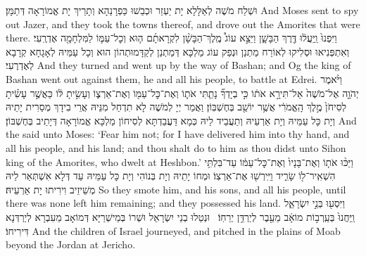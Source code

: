 {וּשְׁלַח מֹשֶׁה לְאַלָּלָא יָת יַעְזֵר וּכְבַשׁוּ כַּפְרָנַהָא וְתָרֵיךְ יָת אֱמוֹרָאָה דְּתַמָּן׃}
{And Moses sent to spy out Jazer, and they took the towns thereof, and drove out the Amorites that were there.}{}
{וַיִּפְנוּ֙ וַֽיַּעֲל֔וּ דֶּ֖רֶךְ הַבָּשָׁ֑ן וַיֵּצֵ֣א עוֹג֩ מֶֽלֶךְ־הַבָּשָׁ֨ן לִקְרָאתָ֜ם ה֧וּא וְכׇל־עַמּ֛וֹ לַמִּלְחָמָ֖ה אֶדְרֶֽעִי׃}
{וְאִתְפְּנִיאוּ וּסְלִיקוּ לְאוֹרַח מַתְנַן וּנְפַק עוֹג מַלְכָּא דְּמַתְנַן לְקַדָּמוּתְהוֹן הוּא וְכָל עַמֵּיהּ לְאָגָחָא קְרָבָא לְאֶדְרֶעִי׃}
{And they turned and went up by the way of Bashan; and Og the king of Bashan went out against them, he and all his people, to battle at Edrei.}{}
{וַיֹּ֨אמֶר יְהֹוָ֤ה אֶל־מֹשֶׁה֙ אַל־תִּירָ֣א אֹת֔וֹ כִּ֣י בְיָדְךָ֞ נָתַ֧תִּי אֹת֛וֹ וְאֶת־כׇּל־עַמּ֖וֹ וְאֶת־אַרְצ֑וֹ וְעָשִׂ֣יתָ לּ֔וֹ כַּאֲשֶׁ֣ר עָשִׂ֗יתָ לְסִיחֹן֙ מֶ֣לֶךְ הָֽאֱמֹרִ֔י אֲשֶׁ֥ר יוֹשֵׁ֖ב בְּחֶשְׁבּֽוֹן׃
}
{וַאֲמַר יְיָ לְמֹשֶׁה לָא תִדְחַל מִנֵּיהּ אֲרֵי בִידָךְ מְסַרִית יָתֵיהּ וְיָת כָּל עַמֵּיהּ וְיָת אַרְעֵיהּ וְתַעֲבֵיד לֵיהּ כְּמָא דַּעֲבַדְתָּא לְסִיחוֹן מַלְכָּא אֱמוֹרָאָה דְּיָתֵיב בְּחֶשְׁבּוֹן׃}
{And the \lord\space said unto Moses: ‘Fear him not; for I have delivered him into thy hand, and all his people, and his land; and thou shalt do to him as thou didst unto Sihon king of the Amorites, who dwelt at Heshbon.’}{}
{וַיַּכּ֨וּ אֹת֤וֹ וְאֶת־בָּנָיו֙ וְאֶת־כׇּל־עַמּ֔וֹ עַד־בִּלְתִּ֥י הִשְׁאִֽיר־ל֖וֹ שָׂרִ֑יד וַיִּֽירְשׁ֖וּ אֶת־אַרְצֽוֹ׃
}
{וּמְחוֹ יָתֵיהּ וְיָת בְּנוֹהִי וְיָת כָּל עַמֵּיהּ עַד דְּלָא אִשְׁתְּאַר לֵיהּ מְשֵׁיזֵיב וִירִיתוּ יָת אַרְעֵיהּ׃}
{So they smote him, and his sons, and all his people, until there was none left him remaining; and they possessed his land.}{}
\newperek
{}%
{וַיִּסְע֖וּ בְּנֵ֣י יִשְׂרָאֵ֑ל וַֽיַּחֲנוּ֙ בְּעַֽרְב֣וֹת מוֹאָ֔ב מֵעֵ֖בֶר לְיַרְדֵּ֥ן יְרֵחֽוֹ׃ \setuma }
{וּנְטַלוּ בְנֵי יִשְׂרָאֵל וּשְׁרוֹ בְּמֵישְׁרַיָּא דְּמוֹאָב מֵעִבְרָא לְיַרְדְּנָא דִּירִיחוֹ׃}
{And the children of Israel journeyed, and pitched in the plains of Moab beyond the Jordan at Jericho.}{}
